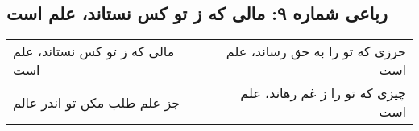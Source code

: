 \begin{center}
\section*{رباعی شماره ۹: مالی که ز تو کس نستاند، علم است}
\label{sec:009}
\begin{longtable}{l p{0.5cm} r}
مالی که ز تو کس نستاند، علم است
&&
حرزی که تو را به حق رساند، علم است
\\
جز علم طلب مکن تو اندر عالم
&&
چیزی که تو را ز غم رهاند، علم است
\\
\end{longtable}
\end{center}
